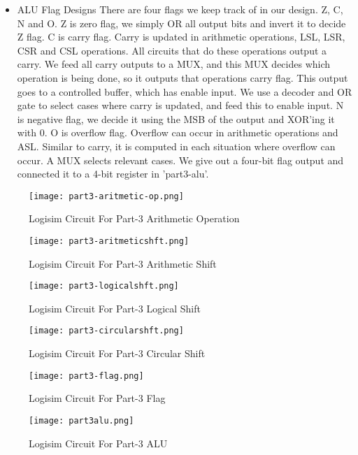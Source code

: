 \documentclass[pdftex,12pt,a4paper]{article}
\begin{document}
\begin{itemize}
\item ALU Flag Designs There are four flags we keep track of in our design. Z, C, N and O. Z is zero flag, we simply OR all output bits and invert it to decide Z flag. C is carry flag. Carry is updated in arithmetic operations, LSL, LSR, CSR and CSL operations. All circuits that do these operations output a carry. We feed all carry outputs to a MUX, and this MUX decides which operation is being done, so it outputs that operations carry flag. This output goes to a controlled buffer, which has enable input. We use a decoder and OR gate to select cases where carry is updated, and feed this to enable input. N is negative flag, we decide it using the MSB of the output and XOR'ing it with 0. O is overflow flag. Overflow can occur in arithmetic operations and ASL. Similar to carry, it is computed in each situation where overflow can occur. A MUX selects relevant cases. We give out a four-bit flag output and connected it to a 4-bit register in 'part3-alu'.
\end{itemize}

\begin{figure}[H]
	\centering
	\texttt{[image: part3-aritmetic-op.png]}	
	\caption{Logisim Circuit For Part-3 Arithmetic Operation}
	\label{fig5}
\end{figure}

\begin{figure}[H]
	\centering
	\texttt{[image: part3-aritmeticshft.png]}	
	\caption{Logisim Circuit For Part-3 Arithmetic Shift}
	\label{fig6}
\end{figure}

\begin{figure}[H]
	\centering
	\texttt{[image: part3-logicalshft.png]}	
	\caption{Logisim Circuit For Part-3 Logical Shift}
	\label{fig7}
\end{figure}

\begin{figure}[H]
	\centering
	\texttt{[image: part3-circularshft.png]}	
	\caption{Logisim Circuit For Part-3 Circular Shift}
	\label{fig8}
\end{figure}

\begin{figure}[H]
	\centering
	\texttt{[image: part3-flag.png]}	
	\caption{Logisim Circuit For Part-3 Flag}
	\label{fig9}
\end{figure}

\begin{figure}[H]
	\centering
	\texttt{[image: part3alu.png]}	
	\caption{Logisim Circuit For Part-3 ALU}
	\label{fig10}
\end{figure}
\end{document}
